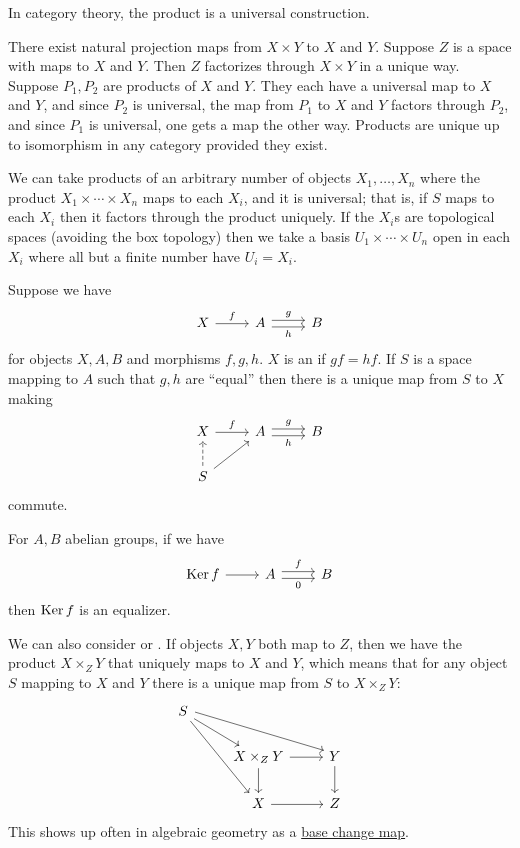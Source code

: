 \documentclass[11pt, twoside]{article}
\begin{document}
In category theory, the product is a universal construction. 

There exist natural projection maps from $X\times Y$ to $X$ and $Y$. Suppose $Z$ is a space with maps to $X$ and $Y$. Then $Z$ factorizes through $X\times Y$ in a unique way. Suppose $P_1,P_2$ are products of $X $ and $Y$. They each have a universal map to $X$ and $Y$, and since $P_2$ is universal, the map from $P_1$ to $X$ and $Y$ factors through $P_2$, and since $P_1$ is universal, one gets a map the other way. Products are unique up to isomorphism in any category provided they exist.

We can take products of an arbitrary number of objects $X_1,\hdots,X_n$ where the product $X_1\times\cdots\times X_n$ maps to each $X_i$, and it is universal; that is, if $S$ maps to each $X_i$ then it factors through the product uniquely. If the $X_i$s are topological spaces (avoiding the box topology) then we take a basis $U_1\times\cdots\times U_n$ open in each $X_i$ where all but a finite number have $U_i=X_i$.

Suppose we have
\[
\begin{tikzcd}
X\arrow[r, "f"] &A \arrow[r, shift left, "g"]\arrow[r, shift right, swap, "h"]& B
\end{tikzcd}
\]
for objects $X, A,B$ and morphisms $f,g,h$. $X$ is an \href{https://en.wikipedia.org/wiki/Equaliser_(mathematics)}{} if $gf=hf$. If $S$ is a space mapping to $A$ such that $g,h$ are ``equal'' then there is a unique map from $S$ to $X$ making 
\[
\begin{tikzcd}
X\arrow[r, "f"] &A \arrow[r, shift left, "g"]\arrow[r, shift right, swap, "h"]& B\\
S \arrow[ru] \arrow[u, dashed]
\end{tikzcd}
\]
commute. 

For $A, B$ abelian groups, if we have
\[
\begin{tikzcd}
\Ker f \arrow[r] &A \arrow[r, shift left, "f"]\arrow[r, shift right, swap, "0"]& B
\end{tikzcd}
\]
then $\operatorname{Ker} f$ is an equalizer.

We can also consider \href{https://en.wikipedia.org/wiki/Pullback_(category_theory)}{} or \href{https://en.wikipedia.org/wiki/Pullback_(category_theory)}{}. If objects $X,Y$ both map to $Z$, then we have the product $X\times_Z Y$ that uniquely maps to $X$ and $Y$, which means that for any object $S$ mapping to $X$ and $Y$ there is a unique map from $S $ to $X\times_Z Y$:
\[
\begin{tikzcd}
S \arrow [dr] \arrow[drr, shift left] \arrow[ddr] &&\\
&X\times_Z Y \arrow[r] \arrow[d]& Y\arrow[d]\\
& X\arrow[r]&Z
\end{tikzcd}
\]
This shows up often in algebraic geometry as a \href{https://en.wikipedia.org/wiki/Base_change_theorems}{\color{black}base change map}.
\end{document}
